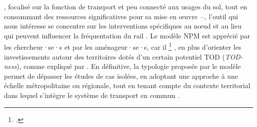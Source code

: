 \begin{refsegment}
{}, focalisé sur la fonction de transport et peu connecté aux usages du sol, tout en consommant des ressources significatives pour sa mise en œuvre~–, l'outil qui nous intéresse se concentre sur les interventions spécifiques au nœud et au lieu qui peuvent influencer la fréquentation du rail \textcolor{blue}{\autocite[2]{caset_integrating_2020}}. Le modèle \acrshort{NPM} est apprécié par les chercheur·se·s et par les aménageur·se·s, car il \footnote{
     \textcolor{blue}{\autocite[41]{lyu_developing_2016}}.
} \textcolor{blue}{\autocite[41]{lyu_developing_2016}}, en plus d'orienter les investissements autour des territoires dotés d'un certain potentiel \acrshort{TOD} (\textsl{TOD-ness}), comme expliqué par \textcolor{blue}{\textcite[242]{ibrahim_measuring_2023}}. En définitive, la typologie proposée par le modèle permet de dépasser les études de cas isolées, en adoptant une approche à une échelle métropolitaine ou régionale, tout en tenant compte du contexte territorial dans lequel s'intègre le système de transport en commun \textcolor{blue}{\autocite[113]{ibraeva_transit-oriented_2020}}.%


\end{refsegment}
